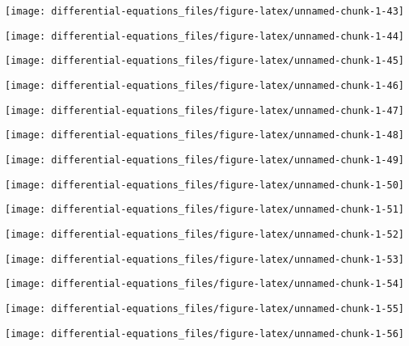 \documentclass[]{tufte-handout}
\begin{document}
\begin{marginfigure}
\texttt{[image: differential-equations\_files/figure-latex/unnamed-chunk-1-43]} \end{marginfigure}
\begin{marginfigure}
\texttt{[image: differential-equations\_files/figure-latex/unnamed-chunk-1-44]} \end{marginfigure}
\begin{marginfigure}
\texttt{[image: differential-equations\_files/figure-latex/unnamed-chunk-1-45]} \end{marginfigure}
\begin{marginfigure}
\texttt{[image: differential-equations\_files/figure-latex/unnamed-chunk-1-46]} \end{marginfigure}
\begin{marginfigure}
\texttt{[image: differential-equations\_files/figure-latex/unnamed-chunk-1-47]} \end{marginfigure}
\begin{marginfigure}
\texttt{[image: differential-equations\_files/figure-latex/unnamed-chunk-1-48]} \end{marginfigure}
\begin{marginfigure}
\texttt{[image: differential-equations\_files/figure-latex/unnamed-chunk-1-49]} \end{marginfigure}
\begin{marginfigure}
\texttt{[image: differential-equations\_files/figure-latex/unnamed-chunk-1-50]} \end{marginfigure}
\begin{marginfigure}
\texttt{[image: differential-equations\_files/figure-latex/unnamed-chunk-1-51]} \end{marginfigure}
\begin{marginfigure}
\texttt{[image: differential-equations\_files/figure-latex/unnamed-chunk-1-52]} \end{marginfigure}
\begin{marginfigure}
\texttt{[image: differential-equations\_files/figure-latex/unnamed-chunk-1-53]} \end{marginfigure}
\begin{marginfigure}
\texttt{[image: differential-equations\_files/figure-latex/unnamed-chunk-1-54]} \end{marginfigure}
\begin{marginfigure}
\texttt{[image: differential-equations\_files/figure-latex/unnamed-chunk-1-55]} \end{marginfigure}
\begin{marginfigure}
\texttt{[image: differential-equations\_files/figure-latex/unnamed-chunk-1-56]} \end{marginfigure}
\end{document}
